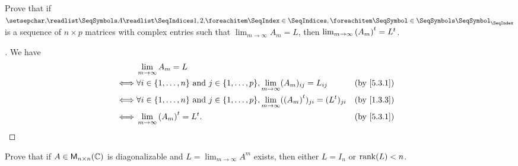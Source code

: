 \exercisesection

\setcounter{ex}{2}
\begin{ex}\label{ex:5.3.3}
	Prove that if \(\seq{A}{1,2,}\) is a sequence of \(n \times p\) matrices with complex entries such that \(\lim_{m \to \infty} A_m = L\), then \(\lim_{m \to \infty} {(A_m)}^{t} = {L}^{t}\).
\end{ex}

\begin{proof}[]
	We have
	\begin{align*}
		     & \lim_{m \to \infty} A_m = L                                                                                                                   \\
		\iff & \forall i \in \set{1, \dots, n} \text{ and } j \in \set{1, \dots, p}, \lim_{m \to \infty} (A_m)_{i j} = L_{i j}               &  & \by{5.3.1} \\
		\iff & \forall i \in \set{1, \dots, n} \text{ and } j \in \set{1, \dots, p}, \lim_{m \to \infty} (\tp{(A_m)})_{j i} = (\tp{L})_{j i} &  & \by{1.3.3} \\
		\iff & \lim_{m \to \infty} \tp{(A_m)} = \tp{L}.                                                                                      &  & \by{5.3.1}
	\end{align*}
\end{proof}

\begin{ex}\label{ex:5.3.4}
	Prove that if \(A \in \ms[n][n][\C]\) is diagonalizable and \(L = \lim_{m \to \infty} A^m\) exists, then either \(L = I_n\) or \(\rk{L} < n\).
\end{ex}

